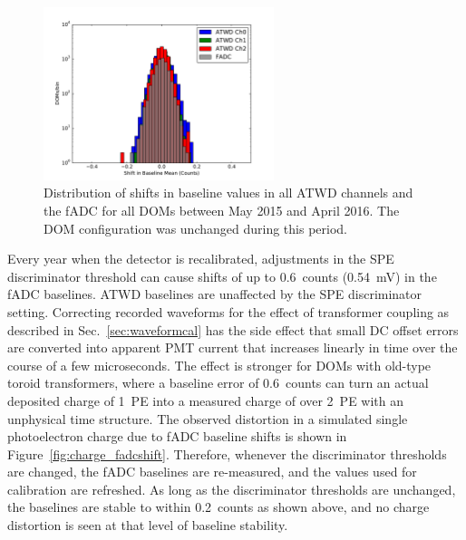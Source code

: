 \begin{figure}[!h]
 \centering
 \includegraphics[width=0.6\textwidth]{graphics/dom/reliability/baseline_stability_2015.pdf}
 \caption{Distribution of shifts in baseline values in all ATWD
   channels and the fADC for all DOMs between May 2015 and April
   2016. The DOM configuration was unchanged during this period.}
 \label{fig:baseline_stability_2015}
\end{figure}

Every year when the detector
is recalibrated, adjustments in the SPE discriminator threshold can
cause shifts of up to 0.6~counts (0.54~mV) in the fADC
baselines. ATWD baselines are unaffected by the SPE discriminator
setting. Correcting recorded waveforms for the effect of transformer
coupling as described in Sec.~\ref{sec:waveformcal} has
the side effect that small DC offset errors are converted into
apparent PMT current that increases linearly in time over the course
of a few microseconds. The effect is stronger for DOMs with old-type toroid
transformers, where a baseline error of 0.6~counts can 
turn an actual deposited charge of 1~PE into a measured charge of over
2~PE with an unphysical time structure. The observed distortion in a
simulated single photoelectron charge due to fADC baseline shifts is
shown in Figure~\ref{fig:charge_fadcshift}.  Therefore, whenever the
discriminator thresholds are changed, the fADC baselines are re-measured,
and the values used for calibration are refreshed. As long as 
the discriminator thresholds are unchanged, the baselines are stable
to within 0.2~counts
as shown above, and no charge distortion is seen at that level of
baseline stability.

